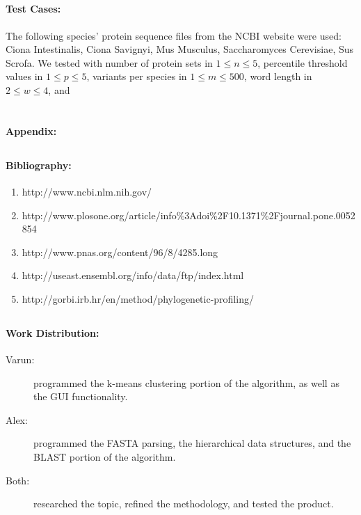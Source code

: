 \documentclass[11pt, oneside]{article}
\begin{document}
\subsection{}
\paragraph
{\bfseries Test Cases:} The following species' protein sequence files from the NCBI website were used: Ciona Intestinalis, Ciona Savignyi, Mus Musculus, Saccharomyces Cerevisiae, Sus Scrofa. We tested with number of protein sets in $1 \le n \le 5$, percentile threshold values in $1 \le p \le 5$, variants per species in $1 \le m \le 500$, word length in $2 \le w \le 4$, and 

\pagebreak
\section{}
{\bfseries Appendix:}

\subsection{}
\paragraph
{\bfseries Bibliography:}
\begin{enumerate}

\item http://www.ncbi.nlm.nih.gov/

\item http://www.plosone.org/article/info\%3Adoi\%2F10.1371\%2Fjournal.pone.0052854

\item http://www.pnas.org/content/96/8/4285.long

\item http://useast.ensembl.org/info/data/ftp/index.html

\item http://gorbi.irb.hr/en/method/phylogenetic-profiling/

\end{enumerate}

\subsection{}
\paragraph
{\bfseries Work Distribution:}
\begin{description}

\item[Varun:] programmed the k-means clustering portion of the algorithm, as well as the GUI functionality.

\item[Alex:] programmed the FASTA parsing, the hierarchical data structures, and the BLAST portion of the algorithm.

\item[Both:] researched the topic, refined the methodology, and tested the product.

\end{description}
\end{document}
